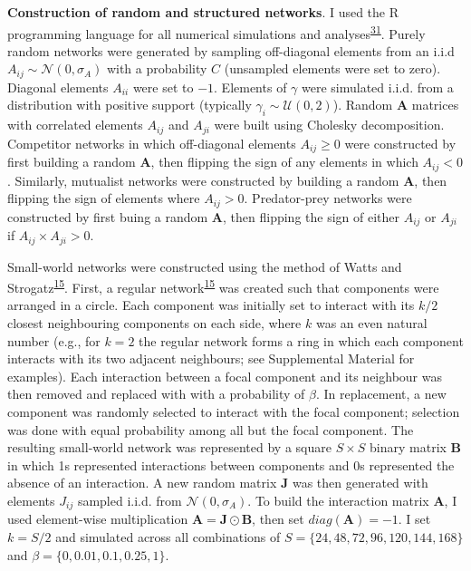 \documentclass[]{article}
\begin{document}
\textbf{Construction of random and structured networks}. I used the R
programming language for all numerical simulations and
analyses\textsuperscript{\protect\hyperlink{ref-Rproject}{31}}. Purely
random networks were generated by sampling off-diagonal elements from an
i.i.d \(A_{ij} \sim \mathcal{N}(0, \sigma_{A})\) with a probability
\(C\) (unsampled elements were set to zero). Diagonal elements
\(A_{ii}\) were set to \(-1\). Elements of \(\gamma\) were simulated
i.i.d. from a distribution with positive support (typically
\(\gamma_{i} \sim \mathcal{U}(0, 2)\)). Random \(\mathbf{A}\) matrices
with correlated elements \(A_{ij}\) and \(A_{ji}\) were built using
Cholesky decomposition. Competitor networks in which off-diagonal
elements \(A_{ij} \geq 0\) were constructed by first building a random
\(\mathbf{A}\), then flipping the sign of any elements in which
\(A_{ij} < 0\). Similarly, mutualist networks were constructed by
building a random \(\mathbf{A}\), then flipping the sign of elements
where \(A_{ij} > 0\). Predator-prey networks were constructed by first
buing a random \(\mathbf{A}\), then flipping the sign of either
\(A_{ij}\) or \(A_{ji}\) if \(A_{ij} \times A_{ji} > 0\).

Small-world networks were constructed using the method of Watts and
Strogatz\textsuperscript{\protect\hyperlink{ref-Watts1998}{15}}. First,
a regular network\textsuperscript{\protect\hyperlink{ref-Watts1998}{15}}
was created such that components were arranged in a circle. Each
component was initially set to interact with its \(k/2\) closest
neighbouring components on each side, where \(k\) was an even natural
number (e.g., for \(k = 2\) the regular network forms a ring in which
each component interacts with its two adjacent neighbours; see
Supplemental Material for examples). Each interaction between a focal
component and its neighbour was then removed and replaced with with a
probability of \(\beta\). In replacement, a new component was randomly
selected to interact with the focal component; selection was done with
equal probability among all but the focal component. The resulting
small-world network was represented by a square \(S \times S\) binary
matrix \(\mathbf{B}\) in which 1s represented interactions between
components and 0s represented the absence of an interaction. A new
random matrix \(\mathbf{J}\) was then generated with elements \(J_{ij}\)
sampled i.i.d. from \(\mathcal{N}(0, \sigma_{A})\). To build the
interaction matrix \(\mathbf{A}\), I used element-wise multiplication
\(\mathbf{A} = \mathbf{J} \odot \mathbf{B}\), then set
\(diag(\mathbf{A}) = -1\). I set \(k = S/2\) and simulated across all
combinations of \(S = \{24, 48, 72, 96, 120, 144, 168\}\) and
\(\beta = \{0, 0.01, 0.1, 0.25, 1\}\).
\end{document}
